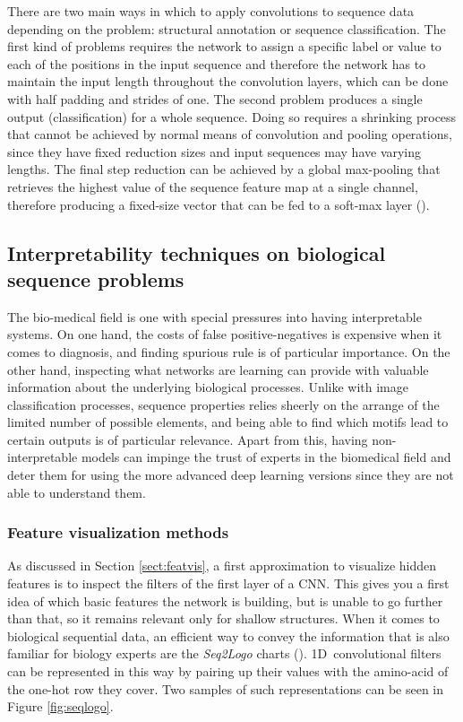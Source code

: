 	There are two main ways in which to apply convolutions to sequence data depending on the problem: structural annotation or sequence classification. The first kind of problems requires the network to assign a specific label or value to each of the positions in the input sequence and therefore the network has to maintain the input length throughout the convolution layers, which can be done with half padding and strides of one. The second problem produces a single output (classification) for a whole sequence. Doing so requires a shrinking process that cannot be achieved by normal means of convolution and pooling operations, since they have fixed reduction sizes and input sequences may have varying lengths. The final step reduction can be achieved by a global max-pooling that retrieves the highest value of the sequence feature map at a single channel, therefore producing a fixed-size vector that can be fed to a soft-max layer (\cite{Jurtz2017}).


	\subsection{Interpretability techniques on biological sequence problems}
	The bio-medical field is one with special pressures into having interpretable systems. On one hand, the costs of false positive-negatives is expensive when it comes to diagnosis, and finding spurious rule is of particular importance. On the other hand, inspecting what networks are learning can provide with valuable information about the underlying biological processes. Unlike with image classification processes, sequence properties relies sheerly on the arrange of the limited number of possible elements, and being able to find which motifs lead to certain outputs is of particular relevance. Apart from this, having non-interpretable models can impinge the trust of experts in the biomedical field and deter them for using the more advanced deep learning versions since they are not able to understand them.

		\subsubsection*{Feature visualization methods}
		As discussed in Section \ref{sect:featvis}, a first approximation to visualize hidden features is to inspect the filters of the first layer of a CNN. This gives you a first idea of which basic features the network is building, but is unable to go further than that, so it remains relevant only for shallow structures. When it comes to biological sequential data, an efficient way to convey the information that is also familiar for biology experts are the \textit{Seq2Logo} charts (\cite{Thomsen2012}). 1D~convolutional filters can be represented in this way by pairing up their values with the amino-acid of the one-hot row they cover. Two samples of such representations can be seen in Figure \ref{fig:seqlogo}.
		
